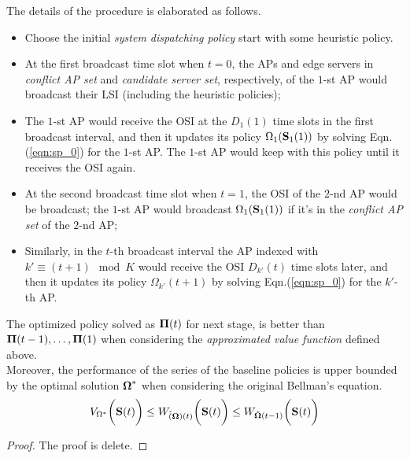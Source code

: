 The details of the procedure is elaborated as follows.
\begin{itemize}
    \item Choose the initial \emph{system dispatching policy} start with some heuristic policy.
    \item At the first broadcast time slot when $t=0$, the APs and edge servers in \emph{conflict AP set} and \emph{candidate server set}, respectively, of the $1$-st AP would broadcast their LSI (including the heuristic policies);
    \item The $1$-st AP would receive the OSI at the $D_1(1)$ time slots in the first broadcast interval, and then it updates its policy $\Omega_{1}(\mathbf{S}_{1}(1))$ by solving Eqn.(\ref{eqn:sp_0}) for the $1$-st AP.
    The $1$-st AP would keep with this policy until it receives the OSI again.
    \item At the second broadcast time slot when $t=1$, the OSI of the $2$-nd AP would be broadcast;
    the $1$-st AP would broadcast $\Omega_{1}(\mathbf{S}_{1}(1))$ if it's in the \emph{conflict AP set} of the $2$-nd AP;
    \item Similarly, in the $t$-th broadcast interval the AP indexed with $k' \equiv (t + 1)\mod{K}$ would receive the OSI $D_{k'}(t)$ time slots later, and then it updates its policy $\Omega_{k'}(t+1)$ by solving Eqn.(\ref{eqn:sp_0}) for the $k'$-th AP.
\end{itemize}

\begin{lemma}
    The optimized policy solved as $\boldsymbol{\Pi}(t)$ for next stage, is better than $\boldsymbol{\Pi}(t-1), \dots, \boldsymbol{\Pi}(1)$ when considering the \emph{approximated value function} defined above.
    \\
    Moreover, the performance of the series of the baseline policies is upper bounded by the optimal solution $\boldsymbol{\Omega}^*$ when considering the original Bellman's equation.
    $$
        V_{\Omega^*}\bigg(\mathbf{S}(t)\bigg)
        \leq W_{\tilde(\boldsymbol{\Omega})(t)}\bigg(\mathbf{S}(t)\bigg)
        \leq W_{\tilde{\boldsymbol{\Omega}}(t-1)}\bigg(\mathbf{S}(t)\bigg)
    $$
\end{lemma}
\begin{proof}
    The proof is delete.
\end{proof}

